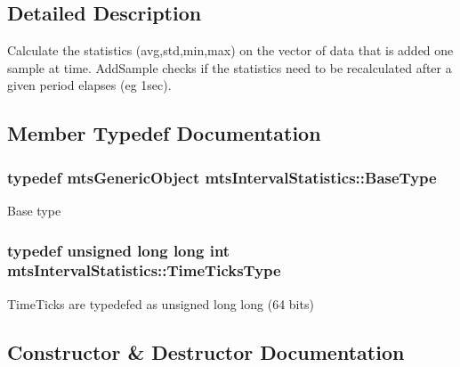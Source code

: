 \subsection{Detailed Description}
Calculate the statistics (avg,std,min,max) on the vector of data that is added one sample at time. Add\+Sample checks if the statistics need to be recalculated after a given period elapses (eg 1sec). 

\subsection{Member Typedef Documentation}
\hypertarget{classmts_interval_statistics_af698a08da830735b7cda531c4089ac04}{}
\subsubsection[{Base\+Type}]{\setlength{\rightskip}{0pt plus 5cm}typedef {\bf mts\+Generic\+Object} {\bf mts\+Interval\+Statistics\+::\+Base\+Type}}\label{classmts_interval_statistics_af698a08da830735b7cda531c4089ac04}
Base type \hypertarget{classmts_interval_statistics_a7cd13b925ee829840466b17fb3051075}{}
\subsubsection[{Time\+Ticks\+Type}]{\setlength{\rightskip}{0pt plus 5cm}typedef unsigned long long int {\bf mts\+Interval\+Statistics\+::\+Time\+Ticks\+Type}}\label{classmts_interval_statistics_a7cd13b925ee829840466b17fb3051075}
Time\+Ticks are typedef\textquotesingle{}ed as unsigned long long (64 bits) 

\subsection{Constructor \& Destructor Documentation}
\hypertarget{classmts_interval_statistics_a3d0c34a5a126ebfbb5d8e665613a7d32}{}
